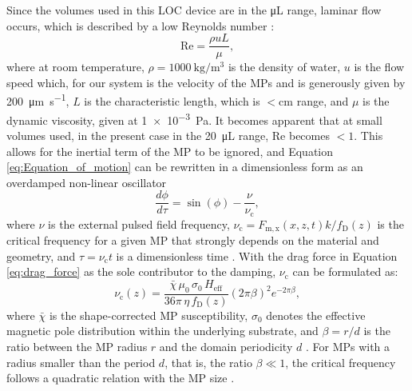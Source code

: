 Since the volumes used in this \ac{LOC} device are in the \si{\micro\L} range, laminar flow occurs, which is described by a low Reynolds number \cite{Shanko2019}:
\begin{equation}\label{eq:Reynolds_number}
    \mathrm{Re} = \frac{\rho u L}{\mu},
\end{equation}
where at room temperature, $\rho=\SI{1000}{\kg\per\cubic\meter}$ is the density of water, $u$ is the flow speed which, for our system is the velocity of the \acp{MP} and is generously given by \SI{200}{\micro\m\per\s}, $L$ is the characteristic length, which is $<\mathrm{cm}$ range, and $\mu$ is the dynamic viscosity, given at \SI{1e-3}{\Pa}. 
It becomes apparent that at small volumes used, in the present case in the \SI{20}{\micro\L} range, $\mathrm{Re}$ becomes $<1$\cite{Shanko2019}.
This allows for the inertial term of the \ac{MP} to be ignored, and Equation \ref{eq:Equation_of_motion} can be rewritten in a dimensionless form as an overdamped non-linear oscillator\cite{Yellen2007}
\begin{equation}\label{eq:overdamped_oscillator}
    \frac{d\phi}{d\tau}=\sin(\phi)-\frac{\nu}{\nu_\mathrm{c}},
\end{equation}
where $\nu$ is the external pulsed field frequency, $\nu_\mathrm{c} = F_\mathrm{m,x}(x,z,t) k/f_\mathrm{D}(z)$ is the critical frequency for a given \ac{MP} that strongly depends on the material and geometry, and $\tau=\nu_\mathrm{c}t$ is a dimensionless time \cite{Yellen2007}. 
With the drag force in Equation \ref{eq:drag_force} as the sole contributor to the damping, $\nu_\mathrm{c}$ can be formulated as:
\begin{equation}\label{eq:critical_frequency}
    \nu_\mathrm{c}(z) = \frac{\bar{\chi} \,\mu_0 \, \sigma_0 \,H_\mathrm{eff}}{36 \pi \,\eta \, f_\mathrm{D}(z)} \left( 2 \pi \beta \right)^2 e^{-2\pi \beta},
\end{equation}
where $\bar{\chi}$ is the shape-corrected \ac{MP} susceptibility, $\sigma_0$ denotes the effective magnetic pole distribution within the underlying substrate, and $\beta = r/d$ is the ratio between the \ac{MP} radius $r$ and the domain periodicity $d$ \cite{Shubbak2026}.
For \acp{MP} with a radius smaller than the period $d$, that is, the ratio $\beta \ll 1$, the critical frequency follows a quadratic relation with the \ac{MP} size \cite{Yellen2007}.

